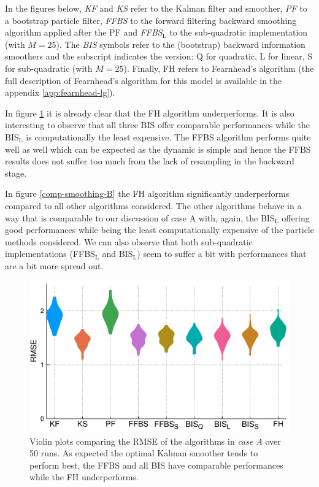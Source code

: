 In the figures below, \emph{KF} and \emph{KS} refer to the Kalman filter and smoother, \emph{PF} to a bootstrap particle filter, \emph{FFBS} to the forward filtering backward smoothing algorithm applied after the PF and \emph{FFBS$_{\text{L}}$} to the sub-quadratic implementation (with $M=25$). The \emph{BIS} symbols refer to the (bootstrap) backward information smoothers and the subscript indicates the version: Q for quadratic, L for linear, S for sub-quadratic (with $M=25$). Finally, FH refers to Fearnhead's algorithm (the full description of Fearnhead's algorithm for this model is available in the appendix \ref{app:fearnhead-lg}).

In figure \ref{comp-smoothing-A} it is already clear that the FH algorithm underperforms. It is also interesting to observe that all three BIS offer comparable performances while the BIS$_{\text{L}}$ is computationally the least expensive.
The FFBS algorithm performs quite well as well which can be expected as the dynamic is simple and hence the FFBS results does not suffer too much from the lack of resampling in the backward stage.

In figure \ref{comp-smoothing-B} the FH algorithm significantly underperforms compared to all other algorithms considered. The other algorithms behave in a way that is comparable to our discussion of case A with, again, the BIS$_{\text{L}}$ offering good performances while being the least computationally expensive of the particle methods considered. 
We can also observe that both sub-quadratic implementations (FFBS$_{\text{L}}$ and BIS$_{\text{L}}$) seem to suffer a bit with performances that are a bit more spread out. 


\begin{figure}[!h]
\center
\includegraphics[width=.65\textwidth]{figures/tfs/comparison_caseA}
\caption{\label{comp-smoothing-A}Violin plots comparing the RMSE of the algorithms in \emph{case A} over 50 runs. As expected the optimal Kalman smoother tends to perform best, the FFBS and all BIS have comparable performances while the FH underperforms.}
\end{figure}

